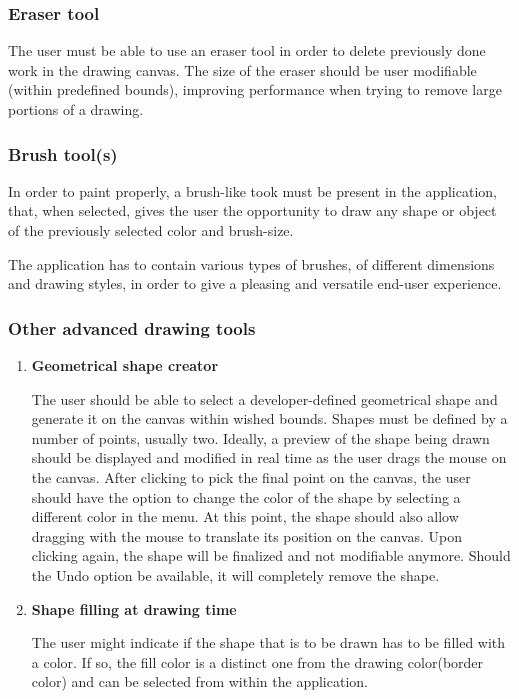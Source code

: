 \documentclass[12pt]{article}
\begin{document}
\subsubsection{Eraser tool}
The user must be able to use an eraser tool in order to delete previously done work in the drawing canvas. The size of the eraser should be user modifiable (within predefined bounds), improving performance when trying to remove large portions of a drawing.
\subsubsection{Brush tool(s)}
In order to paint properly, a brush-like took must be present in the application, that, when selected, gives the user the opportunity to draw any shape or object of the previously selected color and brush-size.

The application has to contain various types of brushes, of different dimensions and drawing styles, in order to give a pleasing and versatile end-user experience.

\subsubsection{Other advanced drawing tools}
\begin{enumerate}

\item  \textbf{Geometrical shape creator}

The user should be able to select a developer-defined geometrical shape and generate it on the canvas within wished bounds. Shapes must be defined by a number of points, usually two. Ideally, a preview of the shape being drawn should be displayed and modified in real time as the user drags the mouse on the canvas. After clicking to pick the final point on the canvas, the user should have the option to change the color of the shape by selecting a different color in the menu. At this point, the shape should also allow dragging with the mouse to translate its position on the canvas. Upon clicking again, the shape will be finalized and not modifiable anymore. Should the Undo option be available, it will completely remove the shape.

\item \textbf{Shape filling at drawing time}

The user might indicate if the shape that is to be drawn has to be filled with a color. If so, the fill color is a distinct one from the drawing color(border color) and can be selected from within the application.

\end{enumerate}
\end{document}
